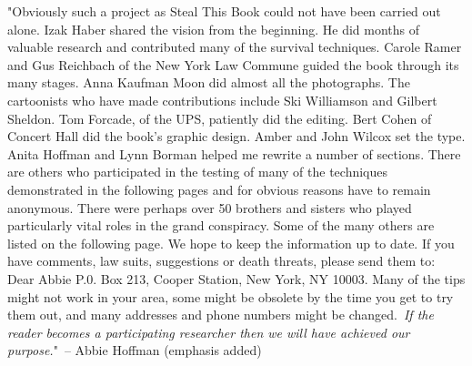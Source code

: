 "Obviously such a project as Steal This Book could not have been carried
out alone. Izak Haber shared the vision from the beginning. He did
months of valuable research and contributed many of the survival
techniques. Carole Ramer and Gus Reichbach of the New York Law Commune
guided the book through its many stages. Anna Kaufman Moon did almost
all the photographs. The cartoonists who have made contributions include
Ski Williamson and Gilbert Sheldon. Tom Forcade, of the UPS, patiently
did the editing. Bert Cohen of Concert Hall did the book's graphic
design. Amber and John Wilcox set the type. Anita Hoffman and Lynn
Borman helped me rewrite a number of sections. There are others who
participated in the testing of many of the techniques demonstrated in
the following pages and for obvious reasons have to remain anonymous.
There were perhaps over 50 brothers and sisters who played particularly
vital roles in the grand conspiracy. Some of the many others are listed
on the following page. We hope to keep the information up to date. If
you have comments, law suits, suggestions or death threats, please send
them to: Dear Abbie P.0. Box 213, Cooper Station, New York, NY 10003.
Many of the tips might not work in your area, some might be obsolete by
the time you get to try them out, and many addresses and phone numbers
might be changed.~\emph{If the reader becomes a participating researcher
then we will have achieved our purpose.}"~-- Abbie Hoffman (emphasis
added)
